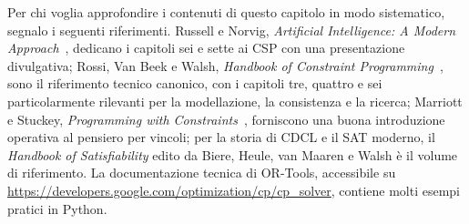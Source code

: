 \begin{biblioparvabox}
Per chi voglia approfondire i contenuti di questo capitolo
in modo sistematico, segnalo i seguenti riferimenti. Russell
e Norvig, \emph{Artificial Intelligence: A Modern
Approach}~\parencite{russell2020}, dedicano i capitoli sei e
sette ai CSP con una presentazione divulgativa; Rossi, Van
Beek e Walsh, \emph{Handbook of Constraint
Programming}~\parencite{rossi2006}, sono il riferimento
tecnico canonico, con i capitoli tre, quattro e sei
particolarmente rilevanti per la modellazione, la
consistenza e la ricerca; Marriott e Stuckey,
\emph{Programming with Constraints}~\parencite{marriott1998},
forniscono una buona introduzione operativa al pensiero per
vincoli; per la storia di CDCL e il SAT moderno, il
\emph{Handbook of Satisfiability} edito da Biere, Heule, van
Maaren e Walsh \`e il volume di riferimento. La
documentazione tecnica di OR-Tools, accessibile su
\url{https://developers.google.com/optimization/cp/cp_solver},
contiene molti esempi pratici in Python.
\end{biblioparvabox}
